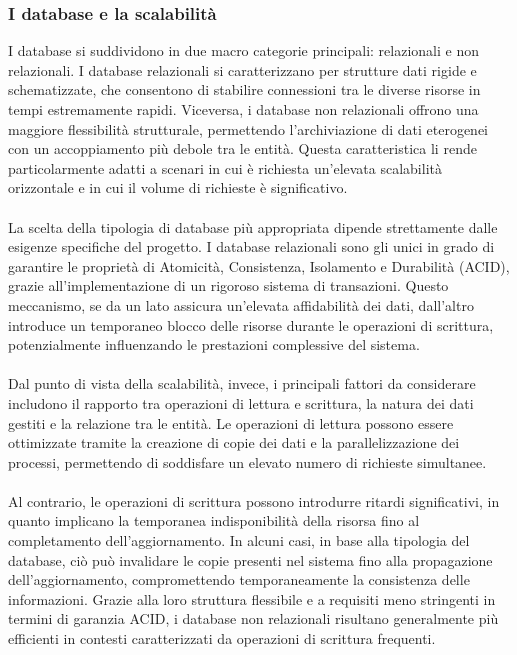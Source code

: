 \subsubsection{I database e la scalabilità}

I database si suddividono in due macro categorie principali: relazionali e non relazionali. 
I database relazionali si caratterizzano per strutture dati rigide e schematizzate, che consentono di stabilire connessioni tra le diverse risorse in tempi estremamente rapidi. 
Viceversa, i database non relazionali offrono una maggiore flessibilità strutturale, permettendo l’archiviazione di dati eterogenei con un accoppiamento più debole tra le entità. 
Questa caratteristica li rende particolarmente adatti a scenari in cui è richiesta un'elevata scalabilità orizzontale e in cui il volume di richieste è significativo.\\
\\

La scelta della tipologia di database più appropriata dipende strettamente dalle esigenze specifiche del progetto. 
I database relazionali sono gli unici in grado di garantire le proprietà di Atomicità, Consistenza, Isolamento e Durabilità (ACID), 
grazie all’implementazione di un rigoroso sistema di transazioni. 
Questo meccanismo, se da un lato assicura un’elevata affidabilità dei dati, dall’altro introduce un temporaneo blocco delle risorse durante le operazioni di scrittura, 
potenzialmente influenzando le prestazioni complessive del sistema.\\
\\
Dal punto di vista della scalabilità, invece, i principali fattori da considerare includono il rapporto tra operazioni di lettura e scrittura, 
la natura dei dati gestiti e la relazione tra le entità. 
Le operazioni di lettura possono essere ottimizzate tramite la creazione di copie dei dati e la parallelizzazione dei processi, 
permettendo di soddisfare un elevato numero di richieste simultanee.\\
\\

Al contrario, le operazioni di scrittura possono introdurre ritardi significativi, in quanto implicano la temporanea indisponibilità della risorsa fino al completamento dell’aggiornamento. 
In alcuni casi, in base alla tipologia del database, ciò può invalidare le copie presenti nel sistema fino alla propagazione dell’aggiornamento, 
compromettendo temporaneamente la consistenza delle informazioni. 
Grazie alla loro struttura flessibile e a requisiti meno stringenti in termini di garanzia ACID, 
i database non relazionali risultano generalmente più efficienti in contesti caratterizzati da operazioni di scrittura frequenti.\\
\\

